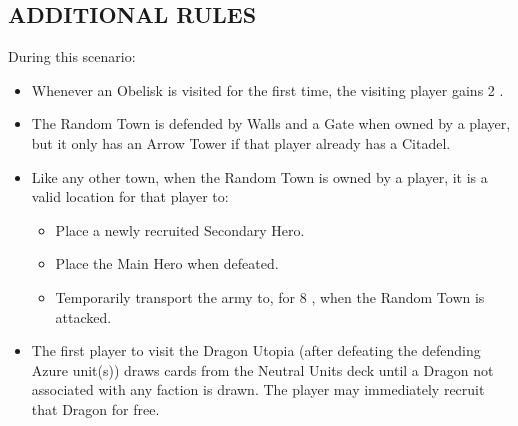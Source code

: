 \begin{multicols}{2}
\subsection*{\MakeUppercase{Additional Rules}}
During this scenario:
\begin{itemize}
  \item Whenever an Obelisk is visited for the first time, the visiting player gains 2 .
  \item The Random Town is defended by Walls and a Gate when owned by a player, but it only has an Arrow Tower if that player already has a Citadel.
  \item Like any other town, when the Random Town is owned by a player, it is a valid location for that player to:
    \begin{itemize}
      \item Place a newly recruited Secondary Hero.
      \item Place the Main Hero when defeated.
      \item Temporarily transport the army to, for 8 , when the Random Town is attacked.
    \end{itemize}
  \item The first player to visit the Dragon Utopia (after defeating the defending Azure unit(s)) draws cards from the Neutral Units  deck until a Dragon not associated with any faction is drawn.
    The player may immediately recruit that Dragon for free.
\end{itemize}

\columnbreak

\phantom{.}
\vfill
\begin{center}
\end{center}
\vfill
\phantom{.}
\end{multicols}


